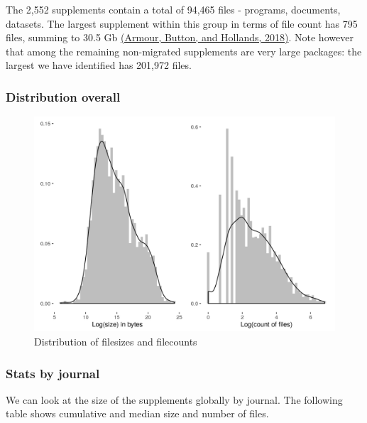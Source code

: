 \documentclass[]{article}
\begin{document}
The 2,552 supplements contain a total of 94,465 files - programs,
documents, datasets. The largest supplement within this group in terms
of file count has 795 files, summing to 30.5 Gb
\href{https://doi.org/10.1257/pandp.20181045}{(Armour, Button, and
Hollands, 2018)}. Note however that among the remaining non-migrated
supplements are very large packages: the largest we have identified has
201,972 files.

\hypertarget{distribution-overall}{%
\subsubsection{Distribution overall}\label{distribution-overall}}

\begin{figure}
\centering
\includegraphics{figure_files.png}
\caption{Distribution of filesizes and filecounts}
\end{figure}

\hypertarget{stats-by-journal}{%
\subsubsection{Stats by journal}\label{stats-by-journal}}

We can look at the size of the supplements globally by journal. The
following table shows cumulative and median size and number of files.
\end{document}
